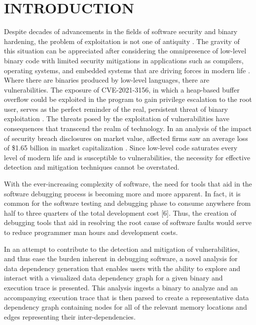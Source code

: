 \chapter{INTRODUCTION}
Despite decades of advancements in the fields of software security and binary hardening, the problem of exploitation is not one of antiquity \citep{cowan1998stackguard, pappas2013transparent}. The gravity of this situation can be appreciated after considering the omnipresence of low-level binary code with limited security mitigations in applications such as compilers, operating systems, and embedded systems that are driving forces in modern life \cite{shoshitaishvili2016sok}. Where there are binaries produced by low-level languages, there are vulnerabilities. The exposure of CVE-2021-3156, in which a heap-based buffer overflow could be exploited in the  program to gain privilege escalation to the root user, serves as the perfect reminder of the real, persistent threat of binary exploitation \citep{CVE-2021-3156}. The threats posed by the exploitation of vulnerabilities have consequences that transcend the realm of technology. In an analysis of the impact of security breach disclosures on market value, affected firms saw an average loss of \$1.65 billion in market capitalization \citep{cavusoglu2004effect}. Since low-level code saturates every level of modern life and is susceptible to vulnerabilities, the necessity for effective detection and mitigation techniques cannot be overstated.  

With the ever-increasing complexity of software, the need for tools that aid in the software debugging process is becoming more and more apparent. In fact, it is common for the software testing and debugging phase to consume anywhere from half to three quarters of the total development cost [6]. Thus, the creation of debugging tools that aid in resolving the root cause of software faults would serve to reduce programmer man hours and development costs. 

In an attempt to contribute to the detection and mitigation of vulnerabilities, and thus ease the burden inherent in debugging software, a novel  analysis for data dependency generation that enables users with the ability to explore and interact with a visualized data dependency graph for a given binary and execution trace is presented. This analysis ingests a binary to analyze and an accompanying execution trace that is then parsed to create a representative data dependency graph containing nodes for all of the relevant memory locations and edges representing their inter-dependencies. 

